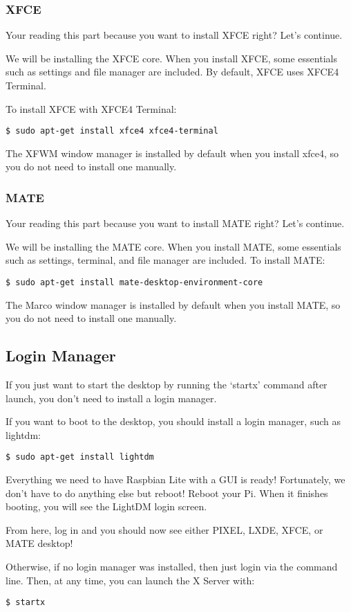 		\subsubsection*{XFCE}
		
			Your reading this part because you want to install XFCE right? Let's continue.
			
			We will be installing the XFCE core. When you install XFCE, some essentials such as settings and file manager are included. By default, XFCE uses XFCE4 Terminal.
			
			To install XFCE with XFCE4 Terminal:
\begin{lstlisting}[style=Terminal, breaklines=true]
$ sudo apt-get install xfce4 xfce4-terminal
\end{lstlisting}

			The XFWM window manager is installed by default when you install xfce4, so you do not need to install one manually.
			
		\subsubsection*{MATE}
		
			Your reading this part because you want to install MATE right? Let's continue.
			
			We will be installing the MATE core. When you install MATE, some essentials such as settings, terminal, and file manager are included. To install MATE:
\begin{lstlisting}[style=Terminal, breaklines=true]
$ sudo apt-get install mate-desktop-environment-core
\end{lstlisting}		

			The Marco window manager is installed by default when you install MATE, so you do not need to install one manually.
			
	\subsection{Login Manager}
	
		If you just want to start the desktop by running the `startx' command after launch, you don't need to install a login manager.
		
		If you want to boot to the desktop, you should install a login manager, such as lightdm:
		
\begin{lstlisting}[style=Terminal, breaklines=true]
$ sudo apt-get install lightdm
\end{lstlisting}

		Everything we need to have Raspbian Lite with a GUI is ready! Fortunately, we don't have to do anything else but reboot! Reboot your Pi. When it finishes booting, you will see the LightDM login screen.
		
		From here, log in and you should now see either PIXEL, LXDE, XFCE, or MATE desktop!
 
		 Otherwise, if no login manager was installed, then just login via the command line. Then, at any time, you can launch the X Server with:
\begin{lstlisting}[style=Terminal, breaklines=true]
$ startx
\end{lstlisting}
